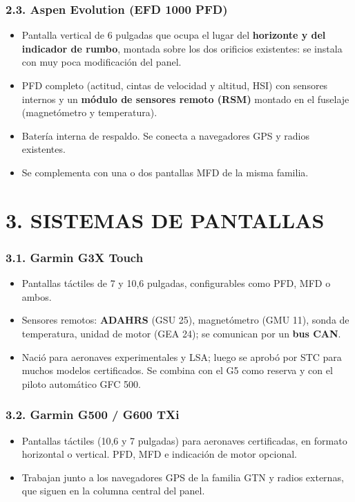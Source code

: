 \subsubsection*{2.3. Aspen Evolution (EFD 1000 PFD)}
\begin{itemize}
  \item Pantalla vertical de 6 pulgadas que ocupa el lugar del \textbf{horizonte y del indicador de
        rumbo}, montada sobre los dos orificios existentes: se instala con muy poca modificación
        del panel.
  \item PFD completo (actitud, cintas de velocidad y altitud, HSI) con sensores internos y un
        \textbf{módulo de sensores remoto (RSM)} montado en el fuselaje (magnetómetro y temperatura).
  \item Batería interna de respaldo. Se conecta a navegadores GPS y radios existentes.
  \item Se complementa con una o dos pantallas MFD de la misma familia.
\end{itemize}

\section*{3. SISTEMAS DE PANTALLAS}

\subsubsection*{3.1. Garmin G3X Touch}
\begin{itemize}
  \item Pantallas táctiles de 7 y 10,6 pulgadas, configurables como PFD, MFD o ambos.
  \item Sensores remotos: \textbf{ADAHRS} (GSU 25), magnetómetro (GMU 11), sonda de temperatura,
        unidad de motor (GEA 24); se comunican por un \textbf{bus CAN}.
  \item Nació para aeronaves experimentales y LSA; luego se aprobó por STC para muchos modelos
        certificados. Se combina con el G5 como reserva y con el piloto automático GFC 500.
\end{itemize}

\subsubsection*{3.2. Garmin G500 / G600 TXi}
\begin{itemize}
  \item Pantallas táctiles (10,6 y 7 pulgadas) para aeronaves certificadas, en formato horizontal
        o vertical. PFD, MFD e indicación de motor opcional.
  \item Trabajan junto a los navegadores GPS de la familia GTN y radios externas, que siguen en la
        columna central del panel.
\end{itemize}


